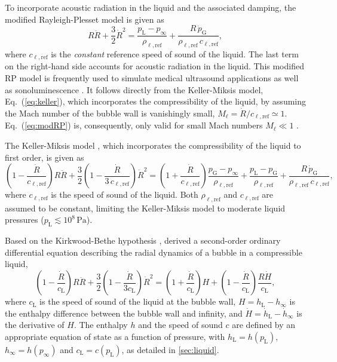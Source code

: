 To incorporate acoustic radiation in the liquid and the associated damping, the modified Rayleigh-Plesset model is given as \citep{Brenner2002}
\begin{equation}
R \ddot{R} + \frac{3}{2} \dot{R}^2 = \frac{p_\text{L} - p_\infty}{\rho_{\ell,\mathrm{ref}}} + \frac{R \, \dot{p}_\text{G}}{\rho_{\ell,\mathrm{ref}} \, c_{\ell,\mathrm{ref}}} ,
\label{eq:modRP}
\end{equation}
where $c_{\ell,\mathrm{ref}}$ is the \textit{constant} reference speed of sound of the liquid. The last term on the right-hand side accounts for acoustic radiation in the liquid.
This modified RP model is frequently used to simulate medical ultrasound applications \citep{Versluis2020} as well as sonoluminescence \citep{Brenner2002}.
It follows directly from the Keller-Miksis model, Eq.~(\ref{eq:keller}), which incorporates the compressibility of the liquid, by assuming the Mach number of the bubble wall is vanishingly small, $M_\ell = \dot{R}/c_{\ell,\mathrm{ref}} \simeq 1$. Eq.~(\ref{eq:modRP}) is, consequently, only valid for small Mach numbers $M_\ell \ll 1$ \citep{Neppiras1980, Prosperetti1986}.

The Keller-Miksis model \citep{Keller1980, Prosperetti1986}, which incorporates the compressibility of the liquid to first order, is given as
\begin{equation}
\left(1 - \frac{\dot{R}}{c_{\ell,\mathrm{ref}}}\right) R \ddot{R} + \frac{3}{2} \left(1 - \frac{\dot{R}}{3\, c_{\ell,\mathrm{ref}}}\right) \dot{R}^2 =  \left(1 + \frac{\dot{R}}{c_{\ell,\mathrm{ref}}}\right) \frac{p_\text{G} - p_\infty}{\rho_{\ell,\mathrm{ref}}} + \frac{p_\text{L} - p_\text{G}}{\rho_{\ell,\mathrm{ref}}}  + \frac{R \, \dot{p}_\text{G}}{\rho_{\ell,\mathrm{ref}} \, c_{\ell,\mathrm{ref}}} ,
\label{eq:keller}
\end{equation}
where $c_{\ell,\mathrm{ref}}$ is the speed of sound of the liquid. Both $\rho_{\ell,\mathrm{ref}}$ and $c_{\ell,\mathrm{ref}}$ are assumed to be constant, limiting the Keller-Miksis model to moderate liquid pressures ($p_\mathrm{L} \lesssim 10^8 \, \mathrm{Pa}$).

Based on the Kirkwood-Bethe hypothesis \citep{Kirkwood1942,Cole1948}, \citet{Gilmore1952} derived a second-order ordinary differential equation describing the radial dynamics of a bubble in a compressible liquid, %
\begin{equation}
  \left( 1 - \frac{\dot{R}}{c_\text{L}} \right) R \ddot{R} + \frac{3}{2} \left( 1 - \frac{\dot{R}}{3 c_\text{L}} \right) \dot{R}^2  = \left( 1 + \frac{\dot{R}}{c_\text{L}} \right) H + \left( 1- \frac{\dot{R}}{c_\text{L}} \right) \frac{R \dot{H}}{c_\text{L}}, \label{eq:gilmore}
\end{equation} 
where $c_\mathrm{L}$ is the speed of sound of the liquid at the bubble wall, $H = h_\text{L} - h_\infty$ is the enthalpy difference between the bubble wall and infinity, and $\dot{H} = \dot{h}_\text{L} - \dot{h}_\infty$ is the derivative of $H$. The enthalpy $h$ and the speed of sound $c$ are defined by an appropriate equation of state as a function of pressure, with $h_\text{L} = h(p_\text{L})$, $h_\infty = h(p_\infty)$ and $c_\text{L} = c(p_\text{L})$, as detailed in \ref{sec:liquid}.

